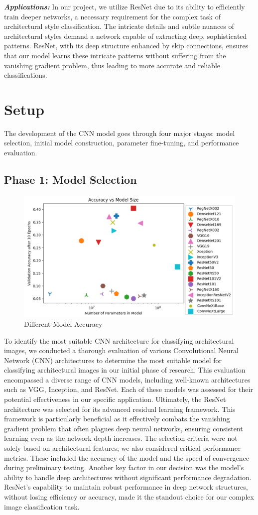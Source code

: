 \documentclass{article}
\begin{document}
\emph{\textbf{Applications:}} In our project, we utilize ResNet due to its ability to efficiently train deeper networks, a necessary requirement for the complex task of architectural style classification. The intricate details and subtle nuances of architectural styles demand a network capable of extracting deep, sophisticated patterns. ResNet, with its deep structure enhanced by skip connections, ensures that our model learns these intricate patterns without suffering from the vanishing gradient problem, thus leading to more accurate and reliable classifications.

\section{Setup}

The development of the CNN model goes through four major stages: model selection, initial model construction, parameter fine-tuning, and performance evaluation.

\subsection{Phase 1: Model Selection}

\begin{figure}[h]
    \centering
    \includegraphics[width=0.5\linewidth]{images/model_selection.jpg}
    \caption{Different Model Accuracy}
    \label{fig:mono}
\end{figure}
To identify the most suitable CNN architecture for classifying architectural images, we conducted a thorough evaluation of various Convolutional Neural Network (CNN) architectures to determine the most suitable model for classifying architectural images in our initial phase of research. This evaluation encompassed a diverse range of CNN models, including well-known architectures such as VGG, Inception, and ResNet. Each of these models was assessed for their potential effectiveness in our specific application. Ultimately, the ResNet architecture was selected for its advanced residual learning framework. This framework is particularly beneficial as it effectively combats the vanishing gradient problem that often plagues deep neural networks, ensuring consistent learning even as the network depth increases. The selection criteria were not solely based on architectural features; we also considered critical performance metrics. These included the accuracy of the model and the speed of convergence during preliminary testing. Another key factor in our decision was the model's ability to handle deep architectures without significant performance degradation. ResNet's capability to maintain robust performance in deep network structures, without losing efficiency or accuracy, made it the standout choice for our complex image classification task.
\end{document}
